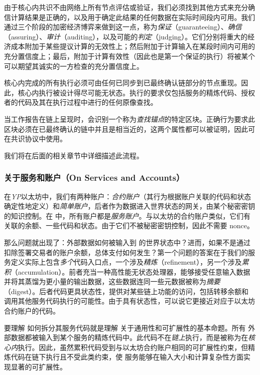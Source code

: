 由于核心内共识不由网络上所有节点评估或验证，我们必须找到其他方式来充分确信计算结果是正确的，以及用于确定此结果的任何数据在实际时间段内可用。我们通过三个阶段的加密经济博弈来做到这一点，称为\emph{保证}（guaranteeing）、\emph{确信}（assuring）、\emph{审计}（auditing），以及可能的\emph{判定}（judging）。它们分别将重大的经济成本附加于某些提议计算的无效性上；然后附加于计算输入在某段时间内可用的充分置信度上；最后，附加于计算有效性（因此也是第一个保证的执行）将被某个可以期望其诚实的一方检查的充分置信度上。

核心内完成的所有执行必须可由任何已同步到已最终确认链部分的节点重现。因此，核心内执行被设计得尽可能无状态。执行的要求仅包括服务的精炼代码、授权者的代码及其在执行过程中进行的任何原像查找。

当工作报告在链上呈现时，会识别一个称为\emph{查找锚点}的特定区块。正确行为要求此区块必须在已最终确认的链中并且是相当近的，这两个属性都可以被证明，因此可在共识协议中使用。

我们将在后面的相关章节中详细描述此流程。

\subsubsection{关于服务和账户（On Services and Accounts）}

在\emph{YP}以太坊中，我们有两种账户：\emph{合约账户}（其行为根据账户关联的代码和状态确定性地定义）和\emph{简单账户}，后者作为数据进入世界状态的网关，由某个秘密密钥的知识控制。在 \Jam 中，所有账户都是\emph{服务账户}。与以太坊的合约账户类似，它们有关联的余额、一些代码和状态。由于它们不被秘密密钥控制，因此不需要 nonce。

那么问题就出现了：外部数据如何被输入到 \Jam 的世界状态中？进而，如果不是通过扣除签署交易者的账户余额，总体支付如何发生？第一个问题的答案在于我们的服务定义实际上包含\emph{多个}代码入口点，一个涉及\emph{精炼}（refinement），另一个涉及\emph{累积}（accumulation）。前者充当一种高性能无状态处理器，能够接受任意输入数据并将其蒸馏为更小量的输出数据，这些数据连同一些元数据被称为\emph{摘要}（digest）。后者代码更具状态性，提供对某些链上功能的访问，包括转移余额和调用其他服务代码执行的可能性。由于具有状态性，可以说它更接近对应于以太坊合约账户的代码。

要理解 \Jam 如何拆分其服务代码就是理解 \Jam 关于通用性和可扩展性的基本命题。所有 \Jam 外部数据都被输入到某个服务的精炼代码中。此代码不在\emph{链上}执行，而是被称为在\emph{核心内}执行。因此，虽然累积代码受到与以太坊合约账户相同的可扩展性约束，但精炼代码在链下执行且不受此类约束，使 \Jam 服务能够在输入大小和计算复杂性方面实现显著的可扩展性。


